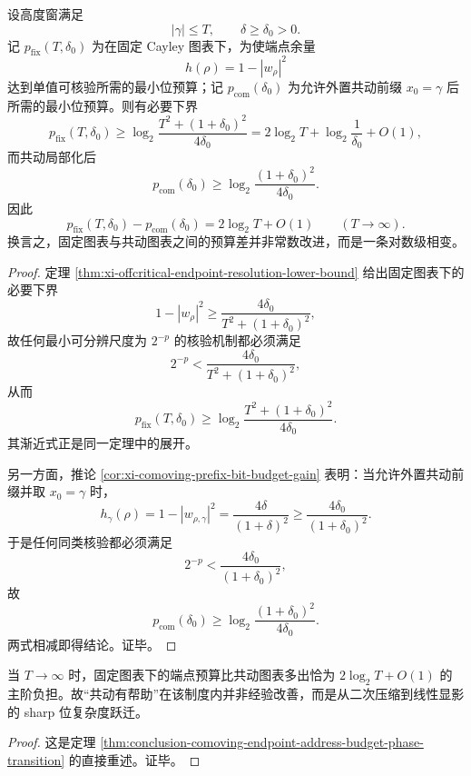 \begin{theorem}[端点二次压缩与共动前缀的精确相变]\label{thm:conclusion-comoving-endpoint-address-budget-phase-transition}
设高度窗满足
\[
|\gamma|\le T,
\qquad
\delta\ge \delta_0>0.
\]
记 \(p_{\mathrm{fix}}(T,\delta_0)\) 为在固定 Cayley 图表下，为使端点余量
\[
h(\rho)=1-|w_\rho|^2
\]
达到单值可核验所需的最小位预算；记 \(p_{\mathrm{com}}(\delta_0)\) 为允许外置共动前缀 \(x_0=\gamma\) 后所需的最小位预算。则有必要下界
\[
p_{\mathrm{fix}}(T,\delta_0)\ge
\log_2\!\frac{T^2+(1+\delta_0)^2}{4\delta_0}
=
2\log_2T+\log_2\frac1{\delta_0}+O(1),
\]
而共动局部化后
\[
p_{\mathrm{com}}(\delta_0)\ge
\log_2\!\frac{(1+\delta_0)^2}{4\delta_0}.
\]
因此
\[
p_{\mathrm{fix}}(T,\delta_0)-p_{\mathrm{com}}(\delta_0)
=
2\log_2T+O(1)
\qquad (T\to\infty).
\]
换言之，固定图表与共动图表之间的预算差并非常数改进，而是一条对数级相变。
\end{theorem}
\begin{proof}
定理 \ref{thm:xi-offcritical-endpoint-resolution-lower-bound} 给出固定图表下的必要下界
\[
1-|w_\rho|^2\ge \frac{4\delta_0}{T^2+(1+\delta_0)^2},
\]
故任何最小可分辨尺度为 \(2^{-p}\) 的核验机制都必须满足
\[
2^{-p}<\frac{4\delta_0}{T^2+(1+\delta_0)^2},
\]
从而
\[
p_{\mathrm{fix}}(T,\delta_0)\ge
\log_2\!\frac{T^2+(1+\delta_0)^2}{4\delta_0}.
\]
其渐近式正是同一定理中的展开。

另一方面，推论 \ref{cor:xi-comoving-prefix-bit-budget-gain} 表明：当允许外置共动前缀并取 \(x_0=\gamma\) 时，
\[
h_\gamma(\rho)=1-|w_{\rho,\gamma}|^2=\frac{4\delta}{(1+\delta)^2}\ge \frac{4\delta_0}{(1+\delta_0)^2}.
\]
于是任何同类核验都必须满足
\[
2^{-p}<\frac{4\delta_0}{(1+\delta_0)^2},
\]
故
\[
p_{\mathrm{com}}(\delta_0)\ge
\log_2\!\frac{(1+\delta_0)^2}{4\delta_0}.
\]
两式相减即得结论。证毕。
\end{proof}

\begin{corollary}[固定图表与共动图表的二比一对数差]\label{cor:conclusion-comoving-endpoint-address-budget-log-phase-transition}
当 \(T\to\infty\) 时，固定图表下的端点预算比共动图表多出恰为 \(2\log_2T+O(1)\) 的主阶负担。故“共动有帮助”在该制度内并非经验改善，而是从二次压缩到线性显影的 sharp 位复杂度跃迁。
\end{corollary}
\begin{proof}
这是定理 \ref{thm:conclusion-comoving-endpoint-address-budget-phase-transition} 的直接重述。证毕。
\end{proof}

